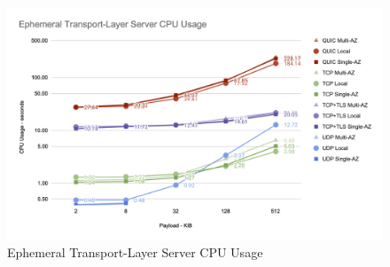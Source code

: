 \begin{figure}[h!]
    \centering
    \includegraphics[width=\linewidth]{figures/charts/Ephemeral Transport-Layer Server CPU Usage.png}
    \caption{Ephemeral Transport-Layer Server CPU Usage}
    \label{fig:ephemeral_server_transport_cpu}
\end{figure}


